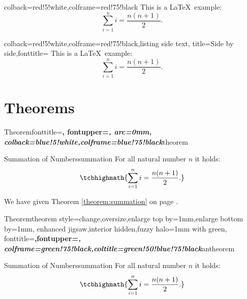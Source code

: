 \begin{tcblisting}{colback=red!5!white,colframe=red!75!black}
	This is a \LaTeX\ example:
	\begin{equation}
		\sum\limits_{i=1}^n i = \frac{n(n+1)}{2}.
	\end{equation}
\end{tcblisting}


\begin{tcblisting}{colback=red!5!white,colframe=red!75!black,listing side text,
		title=Side by side,fonttitle=\bfseries}
	This is a \LaTeX\ example:
	\begin{equation}
		\sum\limits_{i=1}^n i = \frac{n(n+1)}{2}.
	\end{equation}
\end{tcblisting}


\section{Theorems}

%
{Theorem}{fonttitle=\bfseries\upshape, fontupper=\slshape,
	arc=0mm, colback=blue!5!white,colframe=blue!75!black}{theorem}

\begin{theo}{Summation of Numbers}{summation}
	For all natural number $n$ it holds:
	\begin{equation}
		\tcbhighmath{\sum\limits_{i=1}^n i = \frac{n(n+1)}{2}.}
	\end{equation}
\end{theo}

We have given Theorem \ref{theorem:summation} on page \pageref{theorem:summation}.

%
{Theorem}{theorem style=change,oversize,enlarge top by=1mm,enlarge bottom by=1mm,
	enhanced jigsaw,interior hidden,fuzzy halo=1mm with green,
	fonttitle=\bfseries\upshape,fontupper=\slshape,
	colframe=green!75!black,coltitle=green!50!blue!75!black}{antheorem}

\begin{antheo}{Summation of Numbers}{summation}
	For all natural number $n$ it holds:
	\begin{equation}
		\tcbhighmath{\sum\limits_{i=1}^n i = \frac{n(n+1)}{2}.}
	\end{equation}
\end{antheo}

